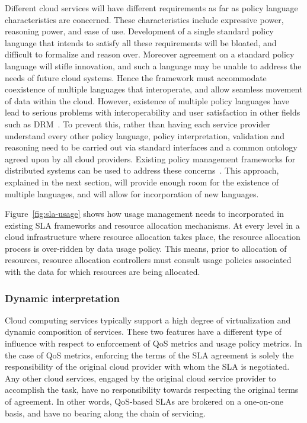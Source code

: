 \documentclass[10pt,letterpaper]{book}
\begin{document}
Different cloud services will have different requirements as far as policy language characteristics are concerned. These characteristics  include expressive power, reasoning power, and ease of use. Development of  a single standard policy language that intends to satisfy all these requirements will be bloated, and difficult to formalize and reason over. Moreover agreement on a standard policy language will stifle innovation, and such a  language may be unable to address the needs of  future cloud systems. Hence the framework must accommodate coexistence of multiple languages that interoperate, and allow seamless movement of data within the cloud. However, existence of multiple policy languages have lead to serious problems with interoperability and user satisfaction in other fields such as DRM~\cite{JaHeMa:06}. To prevent this, rather than having each service provider understand every other policy language, policy interpretation, validation and reasoning need to be carried out via standard interfaces and a common ontology agreed upon by all cloud providers. Existing policy management frameworks for distributed systems can be used to address these concerns~\cite{JaHeLa:10,DaDuLuSl:01}. This approach, explained in the next section, will provide enough room for the existence of multiple languages, and will allow for incorporation of new languages. 

Figure~\ref{fig:sla-usage} shows how usage management needs to incorporated in existing SLA frameworks and resource allocation mechanisms. At every level in a cloud infrastructure where resource allocation takes place, the resource allocation process is over-ridden by data usage policy. This means, prior to allocation of resources,  resource allocation controllers must consult usage policies associated with the data for which resources are being allocated. 

\subsubsection{Dynamic interpretation}
Cloud computing services typically support a high degree of virtualization and dynamic composition of services. These two features have a different type of influence with respect to enforcement of QoS metrics and usage policy metrics. In the case of QoS metrics, enforcing the terms of the SLA agreement is solely the responsibility of the original cloud provider with whom the SLA is negotiated. Any other cloud services, engaged by the original cloud service provider to accomplish the task, have no responsibility towards respecting the original terms of agreement. In other words, QoS-based SLAs are brokered on a one-on-one basis, and have no bearing along the chain of servicing. 
\end{document}
